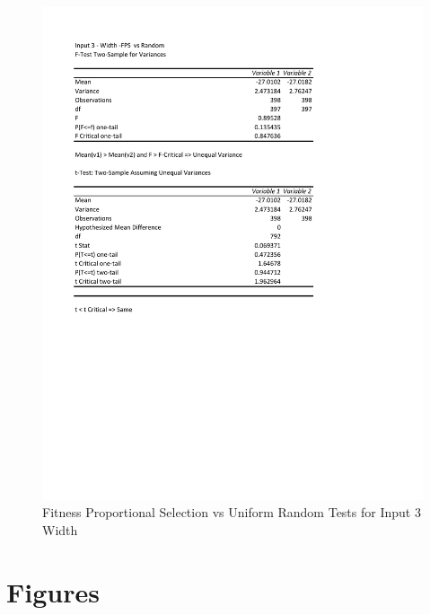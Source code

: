 \documentclass[times]{article}
\begin{document}
	\begin{figure}
		\caption{Fitness Proportional Selection vs Uniform Random Tests for Input 3 Width}
		\label{fig:3parent3_moea}
		\includegraphics[width=\textwidth]{./t_test/3_parent3_moea.pdf}
	\end{figure}	




	\newpage

	\section{Figures}
	
		
\end{document}
